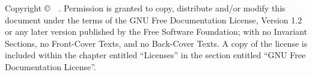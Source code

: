 \documentclass[11pt,onecolumn,letterpaper]{report}%
\begin{document}
\pagestyle{empty}

\author{\thisauthor}
\maketitle



\ifMKhtml
	\clearpage
\else
	\cleardoublepage
\fi
{\parindent 0in
 Copyright \copyright\ \doccpyyear\ \thisauthor.
 Permission is granted to copy, distribute and/or modify this document
 under the terms of the GNU Free Documentation License, Version 1.2
 or any later version published by the Free Software Foundation;
 with no Invariant Sections, no Front-Cover Texts, and no Back-Cover Texts.
 A copy of the license is included within the chapter
 entitled ``Licenses''
 in the section entitled ``GNU Free Documentation License''.}
\ifMKhtml
	\clearpage
\else
	\cleardoublepage
\fi

\pagestyle{plain}

\tableofcontents
\label{chap:tab_of_contents}
\end{document}

